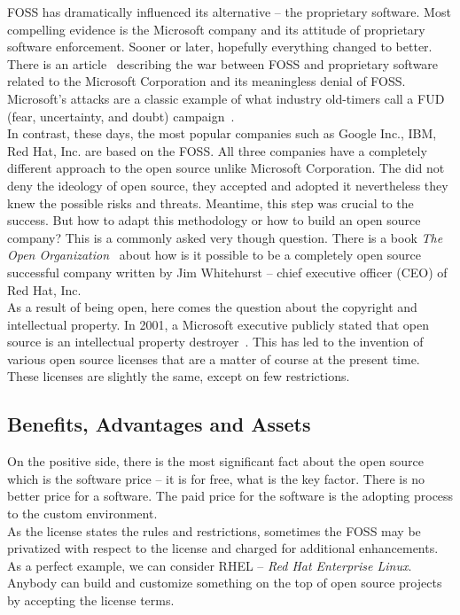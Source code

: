 \documentclass[12pt,a4paper]{article}
\theoremstyle{definition}
\begin{document}
    FOSS has dramatically influenced its alternative -- the proprietary software. Most compelling evidence is the Microsoft company and its attitude of proprietary software enforcement. Sooner or later, hopefully everything changed to better. There is an article~\cite{938720} describing the war between FOSS and proprietary software related to the Microsoft Corporation and its meaningless denial of FOSS. Microsoft's attacks are a classic example of what industry old-timers call a FUD (fear, uncertainty, and doubt) campaign~\cite{938720}.\\

    In contrast, these days, the most popular companies such as Google Inc., IBM, Red Hat, Inc. are based on the FOSS. All three companies have a completely different approach to the open source unlike Microsoft Corporation. The did not deny the ideology of open source, they accepted and adopted it nevertheless they knew the possible risks and threats. Meantime, this step was crucial to the success. But how to adapt this methodology or how to build an open source company? This is a commonly asked very though question. There is a book \textit{The Open Organization}~\cite{whitehurst2015open} about how is it possible to be a completely open source successful company written by Jim Whitehurst -- chief executive officer (CEO) of Red Hat, Inc.\\

    As a result of being open, here comes the question about the copyright and intellectual property. In 2001, a Microsoft executive publicly stated that open source is an intellectual property destroyer~\cite{5662568}. This has led to the invention of various open source licenses that are a matter of course at the present time. These licenses are slightly the same, except on few restrictions.

    \subsection{Benefits, Advantages and Assets}

        On the positive side, there is the most significant fact about the open source which is the software price -- it is for free, what is the key factor. There is no better price for a software. The paid price for the software is the adopting process to the custom environment.\\

        As the license states the rules and restrictions, sometimes the FOSS may be privatized with respect to the license and charged for additional enhancements. As a perfect example, we can consider RHEL -- \textit{Red Hat Enterprise Linux}. Anybody can build and customize something on the top of open source projects by accepting the license terms.\\
\end{document}
